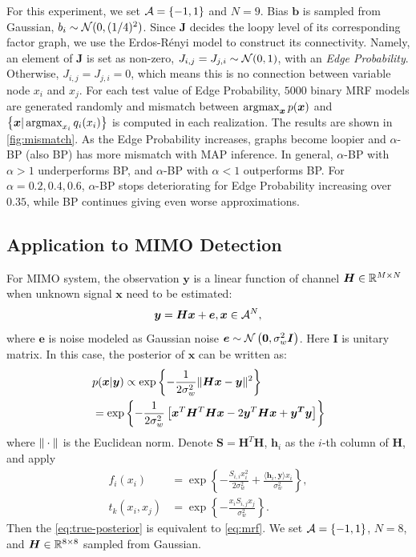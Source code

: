 \documentclass[conference,onecolumn]{IEEEtran}
\begin{document}
For this experiment, we set $\mathcal{A} = \left\{ -1, 1 \right\}$ and $N=9$. Bias $\bm{b}$ is sampled from Gaussian, ${b_i} \sim \mathcal{N}(0, (1/4)^2)$. Since $\bm{J}$ decides the loopy level of its corresponding factor graph, we use the Erdos-Rényi model \cite{erdos1960} to construct its connectivity. Namely, an element of $\bm{J}$ is set as non-zero, $ {J}_{i,j} = {J}_{j,i} \sim \mathcal{N}(0,1)$, with an \textit{Edge Probability}. Otherwise, ${J}_{i, j} = {J}_{j,i} = 0$, which means this is no connection between variable node $x_i$ and $x_j$. For each test value of Edge Probability, $5000$ binary MRF models are generated randomly and mismatch between $\operatorname{argmax}_{\bm{x}} p(\bm{x})$ and $\left\{ \bm{x}|\operatorname{argmax}_{x_i}q_i(x_i) \right\}$ is computed in each realization. The results are shown in \autoref{fig:mismatch}. As the Edge Probability increases, graphs become loopier and $\alpha$-BP (also BP) has more mismatch with MAP inference. In general, $\alpha$-BP with $\alpha > 1$ underperforms BP, and $\alpha$-BP with $\alpha < 1$ outperforms BP. For $\alpha=0.2, 0.4, 0.6$, $\alpha$-BP stops deteriorating for Edge Probability increasing over $0.35$, while BP continues giving even worse approximations.


\subsection{Application to MIMO Detection}

For MIMO system, the observation $\bm{y}$ is a linear function of channel $\bm{H}\in \mathbb{R}^{M\times N}$ when unknown signal $\bm{x}$ need to be estimated:
\begin{equation}\label{eq:linear-model}
  \bm{y} = \bm{H} \bm{x} + \bm{e}, \bm{x} \in \mathcal{A}^N,
\end{equation}
where $\bm{e}$ is  noise modeled as Gaussian noise $ \bm{e} \sim \mathcal{N}\left( \bm{0}, \sigma^2_{w} \bm{I} \right)$. Here $\bm{I}$ is unitary matrix. In this case, the posterior of $\bm{x}$ can be written as:
\begin{align}\label{eq:true-posterior}
  &p(\bm{x}|\bm{y}) \propto \exp\left\{ - \frac{1}{2\sigma_w^2} \| \bm{Hx} - \bm{y} \|^2 \right\} \nonumber \\
  & = \exp\left\{ - \frac{1}{2\sigma_w^2}\left[ \bm{x}^{T}\bm{H}^{T}\bm{H}\bm{x} - 2 \bm{y}^T\bm{H}\bm{x}  + \bm{y^T}\bm{y}  \right] \right\}
\end{align}
where $\| \cdot \|$ is the Euclidean norm. Denote $\bm{S} = \bm{H}^T\bm{H}$, $\bm{h}_i$ as the $i$-th column of $\bm{H}$, and apply
\begin{align}
  f_{{i}}(x_i) &= \exp\left\{- \frac{S_{i,i} x_i^2}{2 \sigma_w^2} + \frac{\langle {\bm{h}_i, \bm{y}}\rangle x_i}{\sigma_w^2} \right\}, \\
  t_{{k}}(x_i, x_j) &= \exp\left\{ -\frac{x_i S_{i,j} x_j}{\sigma_w^2} \right\}.
\end{align}
Then the \autoref{eq:true-posterior} is equivalent to \autoref{eq:mrf}. We set $\mathcal{A} = \left\{ -1, 1 \right\}$, $N = 8$, and $\bm{H}\in \mathbb{R}^{8 \times 8}$ sampled from Gaussian.
\end{document}
